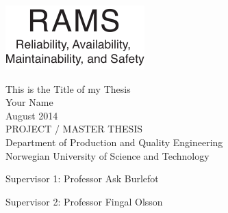 
\thispagestyle{empty}
\includegraphics[scale=1.1]{fig/rams}
\mbox{}\\[6pc]
\begin{center}
\Huge{This is the Title of my Thesis}\\[2pc]

\Large{Your Name}\\[1pc]
\large{August 2014}\\[2pc]

PROJECT / MASTER THESIS\\
Department of Production and Quality Engineering\\
Norwegian University of Science and Technology
\end{center}
\vfill

\noindent Supervisor 1: Professor Ask Burlefot

\noindent Supervisor 2: Professor Fingal Olsson

